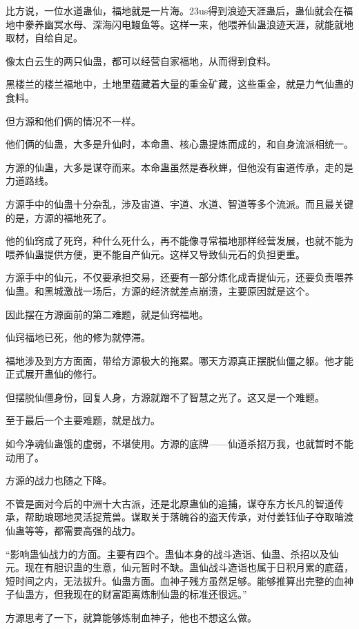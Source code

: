 
\begin{this_body}

比方说，一位水道蛊仙，福地就是一片海。23us得到浪迹天涯蛊后，蛊仙就会在福地中豢养幽冥水母、深海闪电鳗鱼等。这样一来，他喂养仙蛊浪迹天涯，就能就地取材，自给自足。

像太白云生的两只仙蛊，都可以经营自家福地，从而得到食料。

黑楼兰的楼兰福地中，土地里蕴藏着大量的重金矿藏，这些重金，就是力气仙蛊的食料。

但方源和他们俩的情况不一样。

他们俩的仙蛊，大多是升仙时，本命蛊、核心蛊提炼而成的，和自身流派相统一。

方源的仙蛊，大多是谋夺而来。本命蛊虽然是春秋蝉，但他没有宙道传承，走的是力道路线。

方源手中的仙蛊十分杂乱，涉及宙道、宇道、水道、智道等多个流派。而且最关键的是，方源的福地死了。

他的仙窍成了死窍，种什么死什么，再不能像寻常福地那样经营发展，也就不能为喂养仙蛊提供方便，更不能自产仙元。这样又导致仙元石的负担更重。

方源手中的仙元，不仅要承担交易，还要有一部分炼化成青提仙元，还要负责喂养仙蛊。和黑城激战一场后，方源的经济就差点崩溃，主要原因就是这个。

因此摆在方源面前的第二难题，就是仙窍福地。

仙窍福地已死，他的修为就停滞。

福地涉及到方方面面，带给方源极大的拖累。哪天方源真正摆脱仙僵之躯。他才能正式展开蛊仙的修行。

但摆脱仙僵身份，回复人身，方源就蹭不了智慧之光了。这又是一个难题。

至于最后一个主要难题，就是战力。

如今净魂仙蛊饿的虚弱，不堪使用。方源的底牌——仙道杀招万我，也就暂时不能动用了。

方源的战力也随之下降。

不管是面对今后的中洲十大古派，还是北原蛊仙的追捕，谋夺东方长凡的智道传承，帮助琅琊地灵活捉荒兽。谋取关于落魄谷的盗天传承，对付姜钰仙子夺取暗渡仙蛊等等，都需要高强的战力。

“影响蛊仙战力的方面。主要有四个。蛊仙本身的战斗造诣、仙蛊、杀招以及仙元。现在有胆识蛊的生意，仙元暂时不缺。蛊仙战斗造诣也属于日积月累的底蕴，短时间之内，无法拔升。仙蛊方面。血神子残方虽然足够。能够推算出完整的血神子仙蛊方，但我现在的财富距离炼制仙蛊的标准还很远。”

方源思考了一下，就算能够炼制血神子，他也不想这么做。


\end{this_body}
